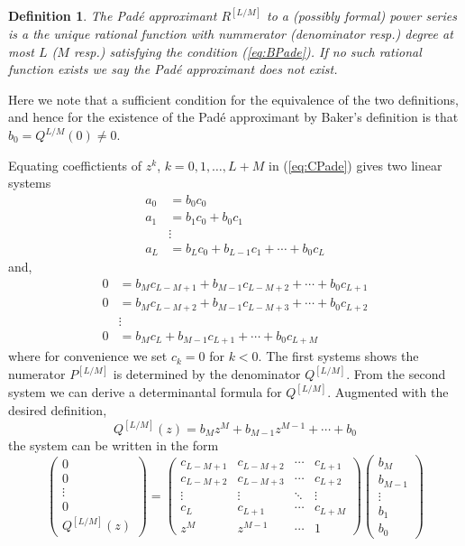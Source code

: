\documentclass{amsart}
\newtheorem{definition}[theorem]{Definition}
\theoremstyle{remark}
\numberwithin{equation}{section}
\begin{document}
\begin{definition}
    The Pad\'e approximant $R^{[L/M]}$ to a (possibly formal) power series is a the unique rational function with nummerator (denominator resp.) degree at most $L$ ($M$ resp.) satisfying the condition (\ref{eq:BPade}). If no such rational function exists we say the Pad\'e approximant does not exist.
\end{definition}

Here we note that a sufficient condition for the equivalence of the two definitions, and hence for the existence of the Pad\'e approximant by Baker's definition is that $b_0 = Q^{L/M}(0) \neq 0$. 

Equating coeffictients of $z^k$, $k = 0, 1, \ldots, L+M$ in (\ref{eq:CPade}) gives two linear systems
\begin{align*}
    a_0 &= b_0c_0 \\
    a_1 &= b_1c_0 + b_0c_1 \\
    &\vdots \\
    a_L &= b_L c_0 + b_{L-1}c_1 + \cdots + b_0c_L
\end{align*}
and,
\begin{align*}
    0 &= b_{M}c_{L-M+1} + b_{M-1}c_{L-M+2} + \cdots + b_0c_{L+1} \\
    0 &= b_{M}c_{L-M+2} + b_{M-1}c_{L-M+3} + \cdots + b_0c_{L+2} \\
    &\vdots \\
    0 &= b_{M}c_L + b_{M-1}c_{L+1} + \cdots + b_0c_{L+M}
\end{align*}
where for convenience we set $c_k = 0$ for $k < 0$. The first systems shows the numerator $P^{[L/M]}$ is determined by the denominator $Q^{[L/M]}$. From the second system we can derive a determinantal formula for $Q^{[L/M]}$. Augmented with the desired definition, 
\[
    Q^{[L/M]}(z) = b_M z^M + b_{M-1}z^{M-1} + \cdots + b_0
\]
the system can be written in the form
\[
    \begin{pmatrix}
        0 \\ 0 \\ \vdots \\ 0 \\ Q^{[L/M]}(z)
    \end{pmatrix}
    =
    \begin{pmatrix}
        c_{L-M+1} & c_{L-M+2} & \cdots & c_{L+1} \\
        c_{L-M+2} & c_{L-M+3} & \cdots & c_{L+2} \\
        \vdots & \vdots & \ddots & \vdots \\
        c_{L} & c_{L+1} & \cdots & c_{L+M} \\
        z^M & z^{M-1} & \cdots & 1
    \end{pmatrix}
    \begin{pmatrix}
        b_M \\ b_{M-1} \\ \vdots \\ b_1 \\ b_0
    \end{pmatrix}
\]
\end{document}
